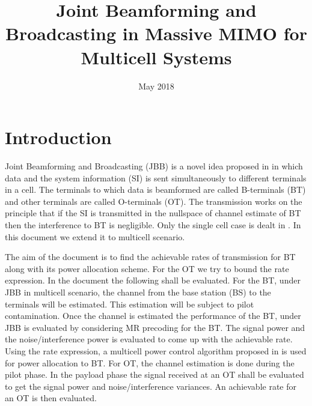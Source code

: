 \documentclass[10pt, a4paper, twoside,fleqn]{article}
\title{Joint Beamforming and Broadcasting in Massive MIMO for Multicell Systems}
\author{}
\date{May 2018}
\begin{document}
\maketitle
 
\section{Introduction}
	Joint Beamforming and Broadcasting (JBB) is a novel idea proposed in \cite{bib:jbb} in which data and the system information (SI) is sent simultaneously to different terminals in a cell. The terminals to which data is beamformed are called B-terminals (BT) and other terminals are called O-terminals (OT). The transmission works on the principle that if the SI is transmitted in the nullspace of channel estimate of BT then the interference to BT is negligible. Only the single cell case is dealt in \cite{bib:jbb}. In this document we extend it to multicell scenario.

	
	The aim of the document is to find the achievable rates of transmission for BT along with its power allocation scheme. For the OT we try to bound the rate expression. In the document the following shall be evaluated. For the BT, under JBB in multicell scenario, the channel from the base station (BS) to the terminals will be estimated. This estimation will be subject to pilot contamination. Once the channel is estimated the performance of the BT, under JBB is evaluated by considering MR precoding for the BT. The signal power and the noise/interference power is evaluated to come up with the achievable rate. Using the rate expression, a multicell power control algorithm proposed in \cite{bib:MassiveMimoBook} is used for power allocation to BT.
     For OT, the channel estimation is done during the pilot phase. In the payload phase the signal received at an OT shall be evaluated to get the signal power and noise/interference variances. An achievable rate for an OT is then evaluated.
\end{document}
